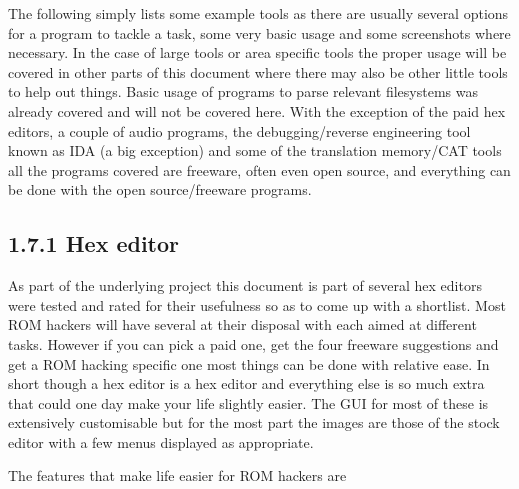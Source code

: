 \documentclass[
]{book}
\begin{document}
The following simply lists some example tools as there are usually several options for a program to tackle a task, some very basic usage and some screenshots where necessary. In the case of large tools or area specific tools the proper usage will be covered in other parts of this document where there may also be other little tools to help out things. Basic usage of programs to parse relevant filesystems was already covered and will not be covered here. With the exception of the paid hex editors, a couple of audio programs, the debugging/reverse engineering tool known as IDA (a big exception) and some of the translation memory/CAT tools all the programs covered are freeware, often even open source, and everything can be done with the open source/freeware programs.

\hypertarget{hex-editor}{%
\subsection{1.7.1 Hex editor}\label{hex-editor}}

As part of the underlying project this document is part of several hex editors were tested and rated for their usefulness so as to come up with a shortlist. Most ROM hackers will have several at their disposal with each aimed at different tasks. However if you can pick a paid one, get the four freeware suggestions and get a ROM hacking specific one most things can be done with relative ease. In short though a hex editor is a hex editor and everything else is so much extra that could one day make your life slightly easier. The GUI for most of these is extensively customisable but for the most part the images are those of the stock editor with a few menus displayed as appropriate.

The features that make life easier for ROM hackers are
\end{document}
